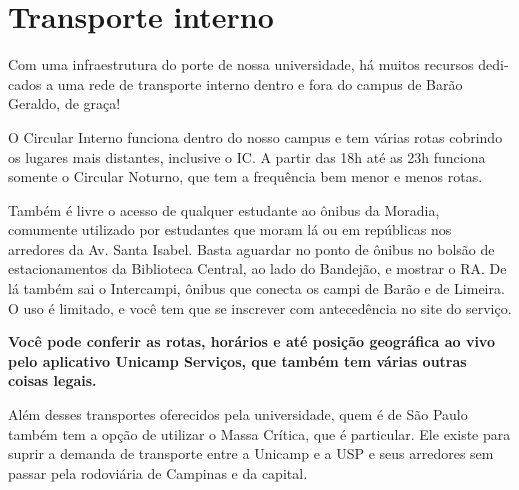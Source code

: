 \section{Transporte interno}

Com uma infraestrutura do porte de nossa universidade, há muitos recursos dedi-
cados a uma rede de transporte interno dentro e fora do campus de Barão Geraldo, de
graça!

O Circular Interno funciona dentro do nosso campus e tem várias rotas cobrindo os
lugares mais distantes, inclusive o IC. A partir das 18h até as 23h funciona somente o
Circular Noturno, que tem a frequência bem menor e menos rotas.

Também é livre o acesso de qualquer estudante ao ônibus da Moradia, comumente
utilizado por estudantes que moram lá ou em repúblicas nos arredores da Av. Santa
Isabel. Basta aguardar no ponto de ônibus no bolsão de estacionamentos da Biblioteca
Central, ao lado do Bandejão, e mostrar o RA. De lá também sai o Intercampi, ônibus que
conecta os campi de Barão e de Limeira. O uso é limitado, e você tem que se inscrever
com antecedência no site do serviço.

\textbf{Você pode conferir as rotas, horários e até posição geográfica ao vivo pelo aplicativo
Unicamp Serviços, que também tem várias outras coisas legais.}

Além desses transportes oferecidos pela universidade, quem é de São Paulo também
tem a opção de utilizar o Massa Crítica, que é particular. Ele existe para suprir a
demanda de transporte entre a Unicamp e a USP e seus arredores sem passar pela
rodoviária de Campinas e da capital.
